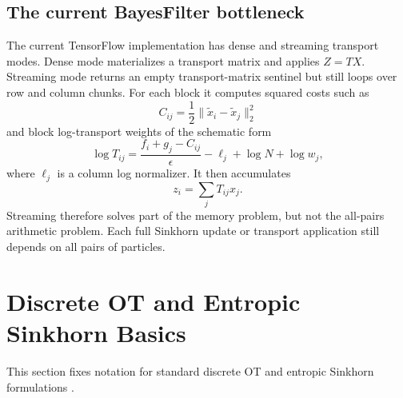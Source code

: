 \documentclass[11pt]{article}
\begin{document}
\subsection{The current BayesFilter bottleneck}

The current TensorFlow implementation has dense and streaming transport modes.
Dense mode materializes a transport matrix and applies $Z=TX$.  Streaming mode
returns an empty transport-matrix sentinel but still loops over row and column
chunks.  For each block it computes squared costs such as
\begin{equation}
C_{ij} = \frac{1}{2}\|\tilde x_i-\tilde x_j\|_2^2
\label{eq:current-cost}
\end{equation}
and block log-transport weights of the schematic form
\begin{equation}
\log T_{ij}
=
\frac{f_i+g_j-C_{ij}}{\epsilon}
- \ell_j
+ \log N
+ \log w_j,
\label{eq:current-log-transport}
\end{equation}
where $\ell_j$ is a column log normalizer.  It then accumulates
\begin{equation}
z_i = \sum_j T_{ij}x_j.
\label{eq:current-streamed-application}
\end{equation}
Streaming therefore solves part of the memory problem, but not the all-pairs
arithmetic problem.  Each full Sinkhorn update or transport application still
depends on all pairs of particles.

\section{Discrete OT and Entropic Sinkhorn Basics}

This section fixes notation for standard discrete OT and entropic Sinkhorn
formulations \citep{villani2003topics,cuturi2013sinkhorn,peyre2019computational}.
\end{document}
